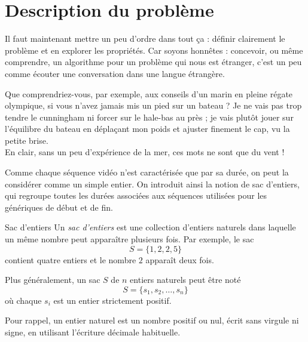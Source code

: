 \documentclass[a4paper,twoside]{article}
\begin{document}
\section{Description du problème}
\label{sec:partition}

Il faut maintenant mettre un peu d'ordre dans tout ça : définir clairement le problème et en explorer les propriétés.
Car soyons honnêtes : concevoir, ou même comprendre, un algorithme pour un problème qui nous est étranger, c'est un peu comme écouter une conversation dans une langue étrangère.

Que comprendriez-vous, par exemple, aux conseils d'un marin en pleine régate olympique, si vous n'avez jamais mis un pied sur un bateau ?
\og Je ne vais pas trop tendre le cunningham ni forcer sur le hale-bas au près ; je vais plutôt jouer sur l'équilibre du bateau en déplaçant mon poids et ajuster finement le cap, vu la petite brise. \fg
\\
En clair, sans un peu d'expérience de la mer, ces mots ne sont que du vent !

Comme chaque séquence vidéo n'est caractérisée que par sa durée, on peut la considérer comme un simple entier.
On introduit ainsi la notion de sac d'entiers, qui regroupe toutes les durées associées aux séquences utilisées pour les génériques de début et de fin.
\begin{definition}{Sac d'entiers}
  Un \emph{sac d'entiers} est une collection d'entiers naturels dans laquelle un même nombre peut apparaître plusieurs fois.
  Par exemple, le sac
  $$S = \{1,2,2,5\}$$
  contient quatre entiers et le nombre $2$ apparaît deux fois.

  Plus généralement, un sac $S$ de $n$ entiers naturels peut être noté
  $$S = \{s_1,s_2,\dots,s_n\}$$
  où chaque $s_i$ est un entier strictement positif.
\end{definition}
Pour rappel, un entier naturel est un nombre positif ou nul, écrit sans virgule ni signe, en utilisant l'écriture décimale habituelle.
\end{document}
